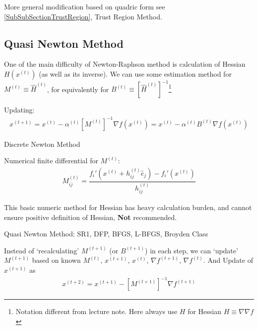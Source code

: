     More general modification based on quadric form see \autoref{SubSubSectionTrustRegion}, Trust Region Method.
    


\subsection{Quasi Newton Method}
\hypertarget{QuasiNewtonMethod}{}
    One of the main difficulty of Newton-Raphson method is calculation of Hessian $ H\left(x^{(t)}\right) $ (as well as its inverse). We can use some estimation method for $ M^{(t)}\equiv \hat{H}^{(t)} $, for equivalently for $ B^{(t)}\equiv\left[\hat{H}^{(t)}\right]^{-1} $\footnote{Notation different from lecture note. Here always use $ H $ for Hessian $ H\equiv\nabla\nabla f $}

    Updating:
    \begin{align}
        x^{(t+1)}=x^{(t)}-\alpha ^{(t)}\left[ M^{(t)} \right]^{-1}\nabla f\left(x^{(t)}\right)=x^{(t)}-\alpha ^{(t)}B^{(t)}\nabla f\left(x^{(t)}\right) 
    \end{align}
    
    

\begin{point}
    Discrete Newton Method
\end{point}

    Numerical finite differential for $ M^{(t)} $:
    \begin{align}
        M^{(t)} _{ij}=\dfrac{f_i'\left(x^{(t)}+h_{ij}^{(t)}\hat{e}_j\right)-f_i'\left(x^{(t)}\right)}{h_{ij}^{(t)}}
    \end{align}
    
    This basic numeric method for Hessian has heavy calculation burden, and cannot ensure positive definition of Hessian,     
    \textbf{Not} recommended. 

\begin{point}
    Quasi Newton Method: SR1, DFP, BFGS, L-BFGS, Broyden Class
\end{point}

    Instead of `recalculating' $ M^{(t+1)} $ (or $ B^{(t+1)} $) in each step, we can `update' $ M^{(t+1)} $ based on known $ M^{(t)} $, $ x^{(t+1)} $, $ x^{(t)} $, $ \nabla f^{(t+1)} $, $ \nabla f^{(t)} $. And Update of $ x^{(t+1)} $ as
    \begin{align}
        x^{(t+2)}=x^{(t+1)}-\left[M^{(t+1)}\right]^{-1}\nabla f^{(t+1)} 
    \end{align}
 

